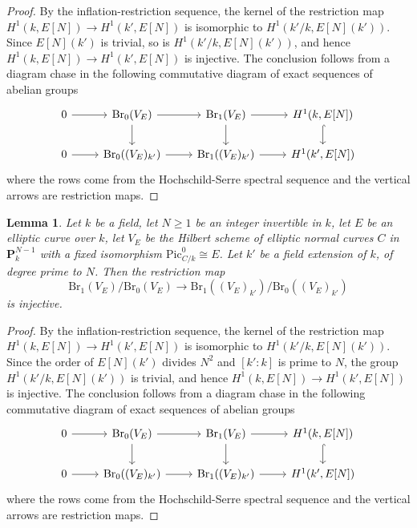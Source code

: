 \documentclass[10pt,letterpaper,twoside]{article}
\renewcommand{\1}{\mathbf{1}}
\newcommand{\bP}{\mathbf{P}}
\renewcommand{\geq}{\geqslant}
\newcommand{\Pic}{\mathrm{Pic}}
\newcommand{\Br}{\mathrm{Br}}
\newcommand{\iso}{\cong}
\theoremstyle{plain}
\newtheorem{lemma}[theorem]{Lemma}
\theoremstyle{plain}
\theoremstyle{definition}
\theoremstyle{named}
\theoremstyle{definition}
\begin{document}
	\begin{proof}
		By the inflation-restriction sequence, the kernel of the restriction map $H^1(k,E[N])\to H^1(k',E[N])$ is isomorphic to $H^1(k'/k,E[N](k'))$. Since $E[N](k')$ is trivial, so is $H^1(k'/k,E[N](k'))$, and hence $H^1(k,E[N])\to H^1(k',E[N])$ is injective.  The conclusion follows from a diagram chase in the following commutative diagram of exact sequences of abelian groups
		\[
		\begin{tikzcd}
			0\arrow[r] &  \Br_0(V_E) \arrow[r] \arrow[d] & \Br_1(V_E) \arrow[r] \arrow[d] & H^1(k,E[N])\arrow[d,hook] \\
			0\arrow[r] &  \Br_0((V_E)_{k'}) \arrow[r] & \Br_1((V_E)_{k'}) \arrow[r] & H^1(k',E[N])
		\end{tikzcd}
		\]
		where the rows come from the Hochschild-Serre spectral sequence and the vertical arrows are restriction maps. 
	\end{proof}
	
	
	\begin{lemma}
		Let $k$ be a field, let $N\geq 1$ be an integer invertible in $k$, let $E$ be an elliptic curve over $k$, let $V_E$ be the Hilbert scheme of elliptic normal curves $C$ in $\bP^{N-1}_k$
		with a fixed isomorphism $\Pic_{C/k}^0\iso E$. Let $k'$ be a field extension of $k$, of degree prime to $N$. Then the restriction map
		\[\Br_1(V_E)/\Br_0(V_E)\to \Br_1((V_E)_{k'})/\Br_0((V_E)_{k'})\]
		is injective.
	\end{lemma}
	
	\begin{proof}
		By the inflation-restriction sequence, the kernel of the restriction map $H^1(k,E[N])\to H^1(k',E[N])$ is isomorphic to $H^1(k'/k,E[N](k'))$. Since the order of $E[N](k')$ divides $N^2$ and $[k':k]$ is prime to $N$, the group $H^1(k'/k,E[N](k'))$ is trivial, and hence $H^1(k,E[N])\to H^1(k',E[N])$ is injective. The conclusion follows from a diagram chase in the following commutative diagram of exact sequences of abelian groups
		\[
		\begin{tikzcd}
			0\arrow[r] &  \Br_0(V_E) \arrow[r] \arrow[d] & \Br_1(V_E) \arrow[r] \arrow[d] & H^1(k,E[N])\arrow[d,hook] \\
			0\arrow[r] &  \Br_0((V_E)_{k'}) \arrow[r] & \Br_1((V_E)_{k'}) \arrow[r] & H^1(k',E[N])
		\end{tikzcd}
		\]
		where the rows come from the Hochschild-Serre spectral sequence and the vertical arrows are restriction maps.
	\end{proof}
	
\end{document}
